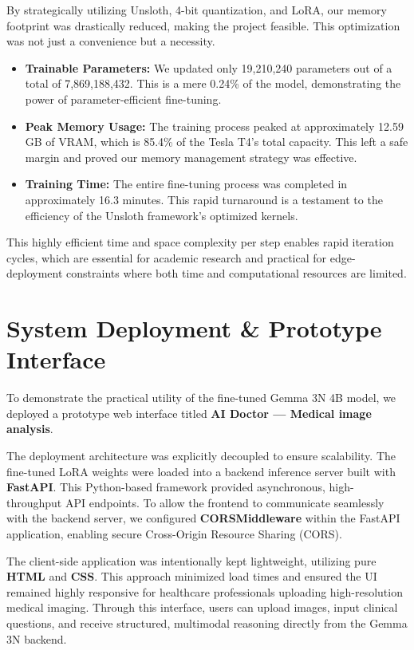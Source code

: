 \documentclass[11pt]{article}
\begin{document}
By strategically utilizing Unsloth, 4-bit quantization, and LoRA, our memory footprint was drastically reduced, making the project feasible. This optimization was not just a convenience but a necessity.
\begin{itemize}
    \item \textbf{Trainable Parameters:} We updated only 19,210,240 parameters out of a total of 7,869,188,432. This is a mere 0.24\% of the model, demonstrating the power of parameter-efficient fine-tuning.
    \item \textbf{Peak Memory Usage:} The training process peaked at approximately 12.59 GB of VRAM, which is 85.4\% of the Tesla T4's total capacity. This left a safe margin and proved our memory management strategy was effective.
    \item \textbf{Training Time:} The entire fine-tuning process was completed in approximately 16.3 minutes. This rapid turnaround is a testament to the efficiency of the Unsloth framework's optimized kernels.
\end{itemize}
This highly efficient time and space complexity per step enables rapid iteration cycles, which are essential for academic research and practical for edge-deployment constraints where both time and computational resources are limited.

\section{System Deployment \& Prototype Interface}
To demonstrate the practical utility of the fine-tuned Gemma 3N 4B model, we deployed a prototype web interface titled \textbf{AI Doctor — Medical image analysis}.

The deployment architecture was explicitly decoupled to ensure scalability. The fine-tuned LoRA weights were loaded into a backend inference server built with \textbf{FastAPI}. This Python-based framework provided asynchronous, high-throughput API endpoints. To allow the frontend to communicate seamlessly with the backend server, we configured \textbf{CORSMiddleware} within the FastAPI application, enabling secure Cross-Origin Resource Sharing (CORS).

The client-side application was intentionally kept lightweight, utilizing pure \textbf{HTML} and \textbf{CSS}. This approach minimized load times and ensured the UI remained highly responsive for healthcare professionals uploading high-resolution medical imaging. Through this interface, users can upload images, input clinical questions, and receive structured, multimodal reasoning directly from the Gemma 3N backend.
\end{document}
